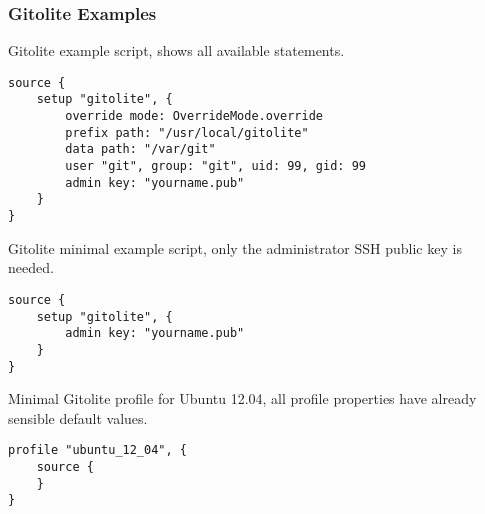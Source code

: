 \subsubsection{Gitolite Examples}

Gitolite example script, shows all available statements.

\begin{lstlisting}[style=Java,label=lst:gitolite_example_script, title={Source.groovy}]
source {
    setup "gitolite", {
        override mode: OverrideMode.override
        prefix path: "/usr/local/gitolite"
        data path: "/var/git"
        user "git", group: "git", uid: 99, gid: 99
        admin key: "yourname.pub"
    }
}
\end{lstlisting}

Gitolite minimal example script, only the administrator SSH public key is needed.

\begin{lstlisting}[style=Java,label=lst:gitolite_example_script, title={Source.groovy}]
source {
    setup "gitolite", {
        admin key: "yourname.pub"
    }
}
\end{lstlisting}

Minimal Gitolite profile for Ubuntu 12.04, all profile properties have 
already sensible default values.

\begin{lstlisting}[style=Java,label=lst:gitolite_ubuntu_profile_min, title={UbuntuProfile.groovy}]
profile "ubuntu_12_04", {
    source {
    }
}
\end{lstlisting}

